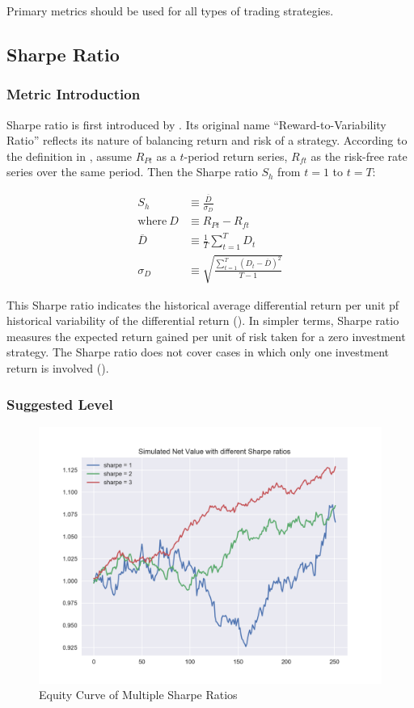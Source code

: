 \documentclass[12pt]{article}
\begin{document}
Primary metrics should be used for all types of trading strategies.

\subsection{Sharpe Ratio}

\subsubsection*{Metric Introduction}

Sharpe ratio is first introduced by \cite{sharpe1966}. Its original name \enquote{Reward-to-Variability Ratio} reflects its nature of balancing return and risk of a strategy. According to the definition in \cite{sharpe1994}, assume \(R_{Pt}\) as a \(t\)-period return series, \(R_{ft}\) as the risk-free rate series over the same period. Then the Sharpe ratio \(S_h\) from \(t=1\) to \(t=T\):

\begin{align*}
  S_h &\equiv \frac{\overline{D}}{\sigma_D} \\
  \text{where}~D &\equiv R_{Pt} - R_{ft} \\
  \overline{D} &\equiv \frac{1}{T} \sum_{t=1}^T D_t \\
  \sigma_D &\equiv \sqrt{\frac{\sum_{t=1}^T (D_t-\overline{D})^2}{T-1}}
\end{align*}

This Sharpe ratio indicates the historical average differential return per unit pf historical variability of the differential return (\cite{sharpe1966}). In simpler terms, Sharpe ratio measures the expected return gained per unit of risk taken for a zero investment strategy. The Sharpe ratio does not cover cases in which only one investment return is involved (\cite{sharpe1994}).

\subsubsection*{Suggested Level}

\begin{figure}[h!]
  \centering
  \includegraphics[scale=0.78]{./ref/figure/sharpe_nav_1200.png}
  \caption{Equity Curve of Multiple Sharpe Ratios}
  \label{fig:sharpe_navs}
\end{figure}
\end{document}
